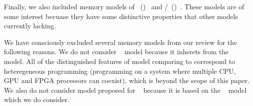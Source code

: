 
Finally, we also included memory models of \OCaml~(\OCMM)~\cite{Dolan-al:PLDI18}
and \JS/\WASM~(\JSMM)~\cite{Watt-el:PLDI2020}.
These models are of some interest becuase 
they have some distinctive properties
that other models currently lacking.

We have consciously excluded several memory models from our review
for the following reasons.
We do not consider \OpenCL~\cite{Batty-el:POPL16} model 
because it inherets from the \CPP model.
All of the distinguished features of \OpenCL model comparing to \CPP
correspond to heteregeneous programming 
(\ie programming on a system where multiple CPU, GPU and FPGA processors can coexist),
which is beyond the scope of this paper. 
We also do not consider model proposed for \LLVM~\cite{Chakraborty-Vafeiadis:CGO17}
because it is based on the \Weakest~\cite{Chakraborty-Vafeiadis:POPL19} 
model which we do consider. 

